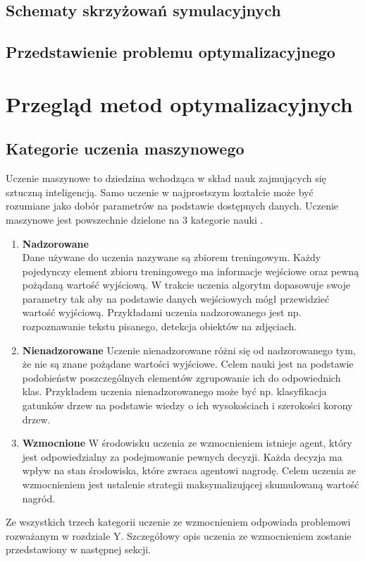 \documentclass[12pt]{book}
\theoremstyle{plain}
\begin{document}
\section{Schematy skrzyżowań symulacyjnych}
\section{Przedstawienie problemu optymalizacyjnego}



\chapter{Przegląd metod optymalizacyjnych}
\section{Kategorie uczenia maszynowego}
Uczenie maszynowe to dziedzina wchodząca w skład nauk zajmujących się sztuczną inteligencją. Samo uczenie w najprostszym kształcie może być rozumiane jako dobór parametrów na podstawie dostępnych danych. Uczenie maszynowe jest powszechnie dzielone na 3 kategorie nauki \cite{machineLearningClassification}.
\begin{enumerate}
\item \textbf{Nadzorowane} \\
Dane używane do uczenia nazywane są zbiorem treningowym. Każdy pojedynczy element zbioru treningowego ma informacje wejściowe oraz pewną pożądaną wartość wyjściową. W trakcie uczenia algorytm dopasowuje swoje parametry tak aby na podstawie danych wejściowych mógł przewidzieć wartość wyjściową. Przykładami uczenia nadzorowanego jest np. rozpoznawanie tekstu pisanego, detekcja obiektów na zdjęciach.
\item \textbf{Nienadzorowane}
Uczenie nienadzorowane różni się od nadzorowanego tym, że nie  są znane pożądane wartości wyjściowe. Celem nauki jest na podstawie podobieństw poszczególnych elementów zgrupowanie ich do odpowiednich klas. Przykładem uczenia nienadzorowanego może być np. klasyfikacja gatunków drzew na podstawie wiedzy o ich wysokościach i szerokości korony drzew.
\item \textbf{Wzmocnione}
W środowisku uczenia ze wzmocnieniem istnieje agent, który jest odpowiedzialny za podejmowanie pewnych decyzji. Każda decyzja ma wpływ na stan środowiska, które zwraca agentowi nagrodę. Celem uczenia ze wzmocnieniem jest ustalenie strategii maksymalizującej skumulowaną wartość nagród.
\end{enumerate}
Ze wszystkich trzech kategorii uczenie ze wzmocnieniem odpowiada problemowi rozważanym w rozdziale Y. Szczegółowy opis uczenia ze wzmocnieniem zostanie przedstawiony w następnej sekcji.
\end{document}
